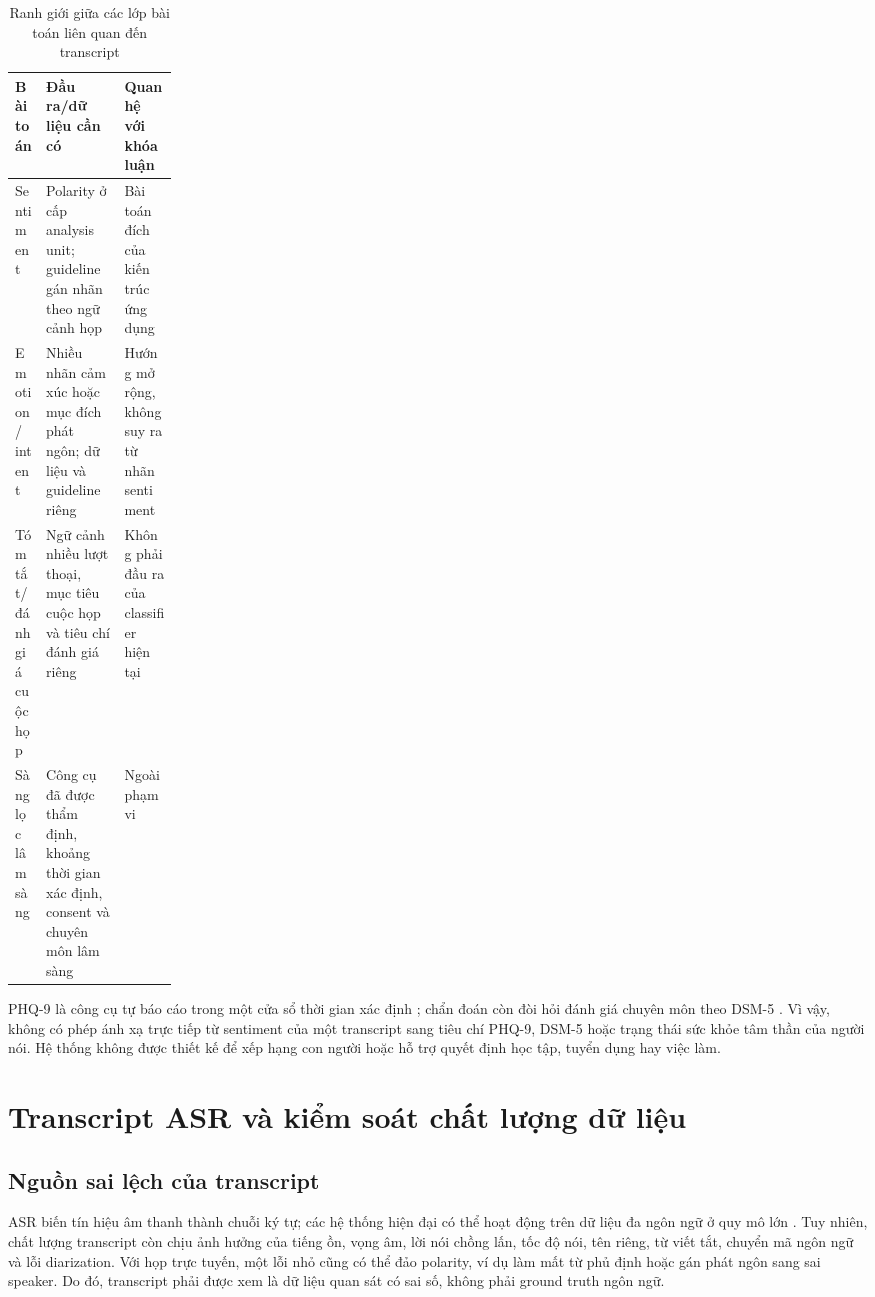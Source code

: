 \begin{table}[H]
\centering
\caption{Ranh giới giữa các lớp bài toán liên quan đến transcript}
\label{tab:task-boundary}
\begin{tabularx}{\linewidth}{p{0.19\linewidth}XX}
\toprule
Bài toán & Đầu ra/dữ liệu cần có & Quan hệ với khóa luận \\ \midrule
Sentiment & Polarity ở cấp analysis unit; guideline gán nhãn theo ngữ cảnh họp & Bài toán đích của kiến trúc ứng dụng \\
Emotion / intent & Nhiều nhãn cảm xúc hoặc mục đích phát ngôn; dữ liệu và guideline riêng & Hướng mở rộng, không suy ra từ nhãn sentiment \\
Tóm tắt/đánh giá cuộc họp & Ngữ cảnh nhiều lượt thoại, mục tiêu cuộc họp và tiêu chí đánh giá riêng & Không phải đầu ra của classifier hiện tại \\
Sàng lọc lâm sàng & Công cụ đã được thẩm định, khoảng thời gian xác định, consent và chuyên môn lâm sàng & Ngoài phạm vi \\ \bottomrule
\end{tabularx}
\end{table}

PHQ-9 là công cụ tự báo cáo trong một cửa sổ thời gian xác định \cite{kroenke2001}; chẩn đoán còn đòi hỏi đánh giá chuyên môn theo DSM-5 \cite{dsm5}. Vì vậy, không có phép ánh xạ trực tiếp từ sentiment của một transcript sang tiêu chí PHQ-9, DSM-5 hoặc trạng thái sức khỏe tâm thần của người nói. Hệ thống không được thiết kế để xếp hạng con người hoặc hỗ trợ quyết định học tập, tuyển dụng hay việc làm.

\section{Transcript ASR và kiểm soát chất lượng dữ liệu}
\subsection{Nguồn sai lệch của transcript}
ASR biến tín hiệu âm thanh thành chuỗi ký tự; các hệ thống hiện đại có thể hoạt động trên dữ liệu đa ngôn ngữ ở quy mô lớn \cite{whisper2022}. Tuy nhiên, chất lượng transcript còn chịu ảnh hưởng của tiếng ồn, vọng âm, lời nói chồng lấn, tốc độ nói, tên riêng, từ viết tắt, chuyển mã ngôn ngữ và lỗi diarization. Với họp trực tuyến, một lỗi nhỏ cũng có thể đảo polarity, ví dụ làm mất từ phủ định hoặc gán phát ngôn sang sai speaker. Do đó, transcript phải được xem là dữ liệu quan sát có sai số, không phải ground truth ngôn ngữ.

